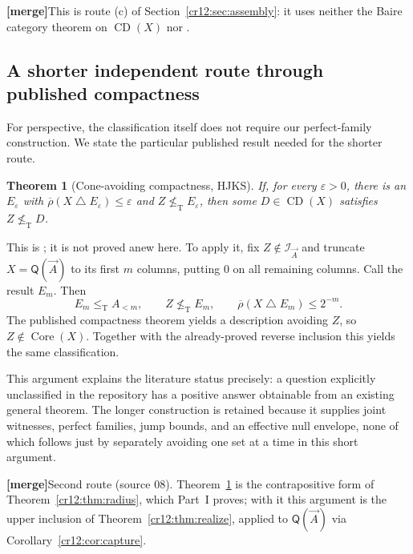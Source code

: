\documentclass[11pt,letterpaper]{article}
\theoremstyle{plain}
\newtheorem{theorem}{Theorem}[section]
\theoremstyle{definition}
\theoremstyle{remark}
\numberwithin{equation}{section}
\newcommand{\leT}{\leq_{\mathrm T}}
\newcommand{\nleT}{\nleq_{\mathrm T}}
\newcommand{\Core}{\operatorname{Core}}
\newcommand{\CD}{\operatorname{CD}}
\newcommand{\sd}{\mathbin{\triangle}}
\newcommand{\I}{\mathcal I}
\newcommand{\mergenote}[1]{\par\smallskip\noindent
 {\small\textsf{\textbf{[merge]}}\enspace #1}\par\smallskip}
\newcommand{\Alt}[1]{A_{<#1}}            %
\newcommand{\QQ}{\mathsf Q}              %
\begin{document}
\mergenote{This is route (c) of Section~\ref{cr12:sec:assembly}: it uses neither the
Baire category theorem on $\CD(X)$ nor \cite[Theorem~3.7]{HJKS}.}

\subsection{A shorter independent route through published compactness}\label{cr12:ep:subsec:compactness}
For perspective, the classification itself does not require our perfect-family
construction. We state the particular published result needed for the shorter
route.

\begin{theorem}[Cone-avoiding compactness, HJKS]\label{cr12:ep:thm:HJKS}
If, for every $\varepsilon>0$, there is an $E_\varepsilon$ with
$\overline\rho(X\sd E_\varepsilon)\le\varepsilon$ and $Z\nleT E_\varepsilon$, then some
$D\in\CD(X)$ satisfies $Z\nleT D$.
\end{theorem}

This is \cite[Theorem~3.7]{HJKS}; it is not proved anew here. To apply it, fix
$Z\notin\I_{\vec A}$ and truncate $X=\QQ(\vec A)$ to its first $m$ columns, putting
$0$ on all remaining columns. Call the result $E_m$. Then
\[
 E_m\leT \Alt m,\qquad Z\nleT E_m,\qquad
 \overline\rho(X\sd E_m)\le2^{-m}.
\]
The published compactness theorem yields a description avoiding $Z$, so
$Z\notin\Core(X)$. Together with the already-proved reverse inclusion this yields
the same classification.

This argument explains the literature status precisely: a question explicitly
unclassified in the repository has a positive answer obtainable from an existing
general theorem. The longer construction is retained because it supplies joint
witnesses, perfect families, jump bounds, and an effective null envelope, none of
which follows just by separately avoiding one set at a time in this short argument.

\mergenote{Second route (source 08). Theorem~\ref{cr12:ep:thm:HJKS} is the contrapositive
form of Theorem~\ref{cr12:thm:radius}, which Part~I proves; with it this argument is
the upper inclusion of Theorem~\ref{cr12:thm:realize}, applied to $\QQ(\vec A)$ via
Corollary~\ref{cr12:cor:capture}.}
\end{document}
